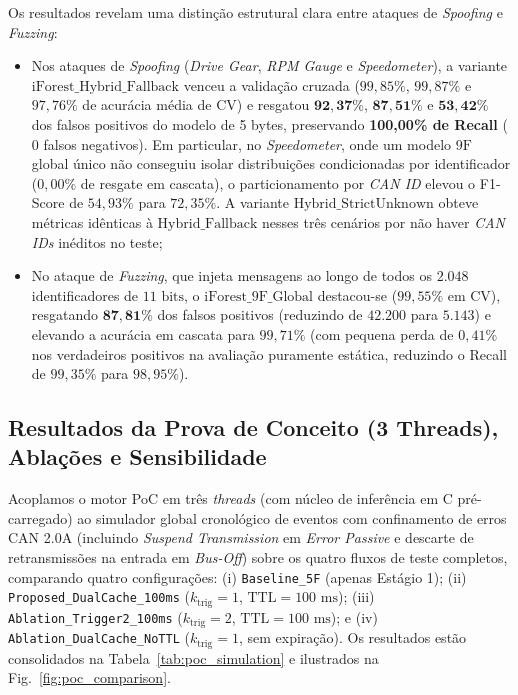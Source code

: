 \documentclass[conference]{IEEEtran}
\begin{document}
Os resultados revelam uma distinção estrutural clara entre ataques de \textit{Spoofing} e \textit{Fuzzing}:
\begin{itemize}
    \item Nos ataques de \textit{Spoofing} (\textit{Drive Gear}, \textit{RPM Gauge} e \textit{Speedometer}), a variante $\text{iForest\_Hybrid\_Fallback}$ venceu a validação cruzada ($99{,}85\%$, $99{,}87\%$ e $97{,}76\%$ de acurácia média de CV) e resgatou $\mathbf{92{,}37\%}$, $\mathbf{87{,}51\%}$ e $\mathbf{53{,}42\%}$ dos falsos positivos do modelo de 5 bytes, preservando \textbf{100,00\% de Recall} ($0$ falsos negativos). Em particular, no \textit{Speedometer}, onde um modelo $9\text{F}$ global único não conseguiu isolar distribuições condicionadas por identificador ($0{,}00\%$ de resgate em cascata), o particionamento por \textit{CAN ID} elevou o F1-Score de $54{,}93\%$ para $72{,}35\%$. A variante $\text{Hybrid\_StrictUnknown}$ obteve métricas idênticas à $\text{Hybrid\_Fallback}$ nesses três cenários por não haver \textit{CAN IDs} inéditos no teste;
    \item No ataque de \textit{Fuzzing}, que injeta mensagens ao longo de todos os $2.048$ identificadores de $11\text{ bits}$, o $\text{iForest\_9F\_Global}$ destacou-se ($99{,}55\%$ em CV), resgatando $\mathbf{87{,}81\%}$ dos falsos positivos (reduzindo de $42.200$ para $5.143$) e elevando a acurácia em cascata para $99{,}71\%$ (com pequena perda de $0{,}41\%$ nos verdadeiros positivos na avaliação puramente estática, reduzindo o Recall de $99{,}35\%$ para $98{,}95\%$).
\end{itemize}

\subsection{Resultados da Prova de Conceito (3 Threads), Ablações e Sensibilidade}
Acoplamos o motor PoC em três \textit{threads} (com núcleo de inferência em C pré-carregado) ao simulador global cronológico de eventos com confinamento de erros CAN 2.0A (incluindo \textit{Suspend Transmission} em \textit{Error Passive} e descarte de retransmissões na entrada em \textit{Bus-Off}) sobre os quatro fluxos de teste completos, comparando quatro configurações: (i) \texttt{Baseline\_5F} (apenas Estágio 1); (ii) \texttt{Proposed\_DualCache\_100ms} ($k_{\text{trig}}=1$, $\text{TTL}=100\text{ ms}$); (iii) \texttt{Ablation\_Trigger2\_100ms} ($k_{\text{trig}}=2$, $\text{TTL}=100\text{ ms}$); e (iv) \texttt{Ablation\_DualCache\_NoTTL} ($k_{\text{trig}}=1$, sem expiração). Os resultados estão consolidados na Tabela~\ref{tab:poc_simulation} e ilustrados na Fig.~\ref{fig:poc_comparison}.
\end{document}
